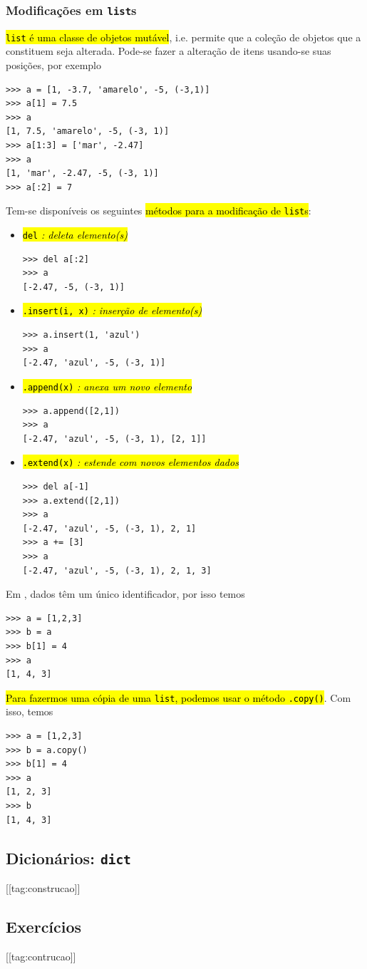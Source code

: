 \subsubsection{Modificações em \lstinline+list+s}

\hl{{\lstinline+list+} é uma classe de objetos mutável}, i.e. permite que a coleção de objetos que a constituem seja alterada. Pode-se fazer a alteração de itens usando-se suas posições, por exemplo
\begin{lstlisting}
>>> a = [1, -3.7, 'amarelo', -5, (-3,1)] 
>>> a[1] = 7.5
>>> a
[1, 7.5, 'amarelo', -5, (-3, 1)]
>>> a[1:3] = ['mar', -2.47]
>>> a
[1, 'mar', -2.47, -5, (-3, 1)]
>>> a[:2] = 7
\end{lstlisting}

Tem-se disponíveis os seguintes \hl{métodos para a modificação de {\lstinline+list+}s}:
\begin{itemize}
\item \hl{{\lstinline+del+} \emph{: deleta elemento(s)}}
\begin{lstlisting}
>>> del a[:2]
>>> a
[-2.47, -5, (-3, 1)]
\end{lstlisting}

\item \hl{{\lstinline+.insert(i, x)+} \emph{: inserção de elemento(s)}}
\begin{lstlisting}
>>> a.insert(1, 'azul')
>>> a
[-2.47, 'azul', -5, (-3, 1)]
\end{lstlisting}

\item \hl{{\lstinline+.append(x)+} \emph{: anexa um novo elemento}}
\begin{lstlisting}
>>> a.append([2,1])
>>> a
[-2.47, 'azul', -5, (-3, 1), [2, 1]]
\end{lstlisting}

\item \hl{{\lstinline+.extend(x)+} \emph{: estende com novos elementos dados}}
\begin{lstlisting}
>>> del a[-1]
>>> a.extend([2,1])
>>> a
[-2.47, 'azul', -5, (-3, 1), 2, 1]
>>> a += [3]
>>> a
[-2.47, 'azul', -5, (-3, 1), 2, 1, 3]
\end{lstlisting}
\end{itemize}

\begin{obs}
  Em {\python}, dados têm um único identificador, por isso temos
\begin{lstlisting}
>>> a = [1,2,3]
>>> b = a
>>> b[1] = 4
>>> a
[1, 4, 3]
\end{lstlisting}
  \hl{Para fazermos uma cópia de uma {\lstinline+list+}, podemos usar o método {\lstinline+.copy()+}}. Com isso, temos
\begin{lstlisting}
>>> a = [1,2,3]
>>> b = a.copy()
>>> b[1] = 4
>>> a
[1, 2, 3]
>>> b
[1, 4, 3]
\end{lstlisting}
\end{obs}

\subsection{Dicionários: \lstinline+dict+}

[[tag:construcao]]

\subsection{Exercícios}

[[tag:contrucao]]
